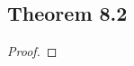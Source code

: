 \documentclass[../../main.tex]{subfiles}
\begin{document}
\subsection{Theorem 8.2}
\begin{wts}

\end{wts}
\begin{proof}

\end{proof}
\end{document}
